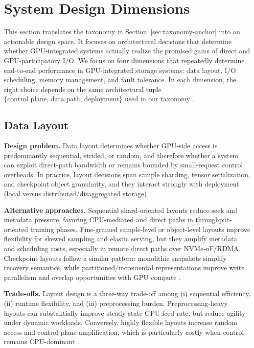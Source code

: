 \section{System Design Dimensions}\label{sec:design-anchor}

This section translates the taxonomy in Section~\ref{sec:taxonomy-anchor} into an actionable design space. It focuses on architectural decisions that determine whether GPU-integrated systems actually realize the promised gains of direct and GPU-participatory I/O. We focus on four dimensions that repeatedly determine end-to-end performance in GPU-integrated storage systems: data layout, I/O scheduling, memory management, and fault tolerance. In each dimension, the right choice depends on the same architectural tuple $\{\text{control plane, data path, deployment}\}$ used in our taxonomy \cite{silberstein2013gpufs,nvidia_gds_overview,qureshi2023bam,geminifs2025}.

\subsection{Data Layout}

\textbf{Design problem.} Data layout determines whether GPU-side access is predominantly sequential, strided, or random, and therefore whether a system can exploit direct-path bandwidth or remains bounded by small-request control overheads. In practice, layout decisions span sample sharding, tensor serialization, and checkpoint object granularity, and they interact strongly with deployment (local versus distributed/disaggregated storage) \cite{murray2021tfdata,hoard2018,zhang2025hpcstoragesurvey}.

\textbf{Alternative approaches.} Sequential shard-oriented layouts reduce seek and metadata pressure, favoring CPU-mediated and direct paths in throughput-oriented training phases. Fine-grained sample-level or object-level layouts improve flexibility for skewed sampling and elastic serving, but they amplify metadata and scheduling costs, especially in remote direct paths over NVMe-oF/RDMA \cite{nvmeof_spec,infiniband_spec,liu2017rackscale}. Checkpoint layouts follow a similar pattern: monolithic snapshots simplify recovery semantics, while partitioned/incremental representations improve write parallelism and overlap opportunities with GPU compute \cite{rajbhandari2021zeroinfinity,geminifs2025}.

\textbf{Trade-offs.} Layout design is a three-way trade-off among (i) sequential efficiency, (ii) runtime flexibility, and (iii) preprocessing burden. Preprocessing-heavy layouts can substantially improve steady-state GPU feed rate, but reduce agility under dynamic workloads. Conversely, highly flexible layouts increase random access and control-plane amplification, which is particularly costly when control remains CPU-dominant \cite{murray2021tfdata,qureshi2023bam}.


